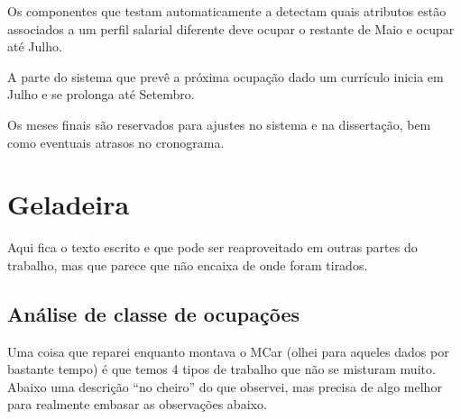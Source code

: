 \documentclass[12pt,a4paper]{article}
\theoremstyle{hypo}
\begin{document}
Os componentes que testam automaticamente a detectam quais atributos estão associados a um perfil salarial diferente deve ocupar o restante de Maio e ocupar até Julho.

A parte do sistema que prevê a próxima ocupação dado um currículo inicia em Julho e se prolonga até Setembro.

Os meses finais são reservados para ajustes no sistema e na dissertação, bem como eventuais atrasos no cronograma.


\section{Geladeira}

Aqui fica o texto escrito e que pode ser reaproveitado em outras partes do trabalho, mas que parece que não encaixa de onde foram tirados.


\subsection{Análise de classe de ocupações}

Uma coisa que reparei enquanto montava o MCar (olhei para aqueles dados por bastante tempo) é que temos 4 tipos de trabalho que não se misturam muito. Abaixo uma descrição \enquote{no cheiro} do que observei, mas precisa de algo melhor para realmente embasar as observações abaixo.
\end{document}
